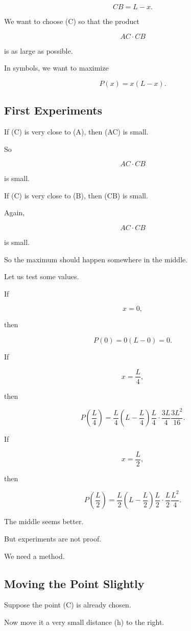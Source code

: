 \[
CB=L-x.
\]

We want to choose (C) so that the product

\[
AC\cdot CB
\]

is as large as possible.

In symbols, we want to maximize

\[
P(x)=x(L-x).
\]

\subsection{First Experiments}

If (C) is very close to (A), then (AC) is small.

So

\[
AC\cdot CB
\]

is small.

If (C) is very close to (B), then (CB) is small.

Again,

\[
AC\cdot CB
\]

is small.

So the maximum should happen somewhere in the middle.

Let us test some values.

If

\[
x=0,
\]

then

\[
P(0)=0(L-0)=0.
\]

If

\[
x=\frac L4,
\]

then

\[
P\left(\frac L4\right) = \frac L4\left(L-\frac L4\right) \frac L4\cdot \frac{3L}{4}\frac{3L^2}{16}.
\]

If

\[
x=\frac L2,
\]

then

\[
P\left(\frac L2\right) = \frac L2\left(L-\frac L2\right) \frac L2\cdot \frac L2 \frac{L^2}{4}.
\]

The middle seems better.

But experiments are not proof.

We need a method.

\subsection{Moving the Point Slightly}

Suppose the point (C) is already chosen.

Now move it a very small distance (h) to the right.

